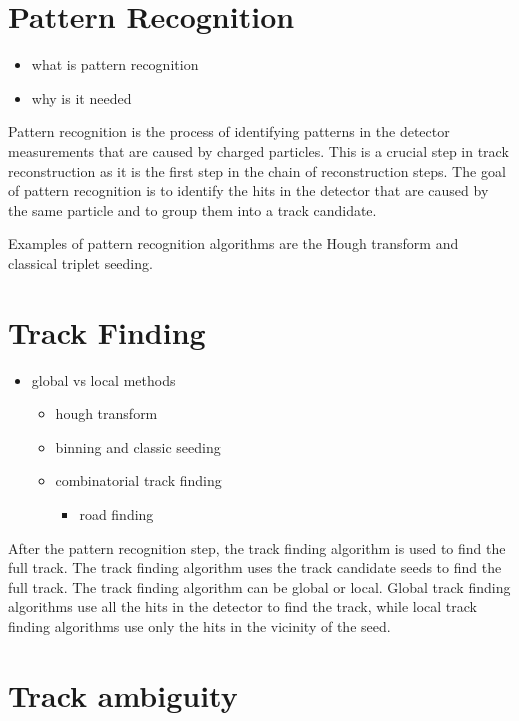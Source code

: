 \section{Pattern Recognition}

\begin{itemize}
    \color{red}
    \item what is pattern recognition
    \item why is it needed
\end{itemize}

Pattern recognition is the process of identifying patterns in the detector measurements that are caused by charged particles. This is a crucial step in track reconstruction as it is the first step in the chain of reconstruction steps. The goal of pattern recognition is to identify the hits in the detector that are caused by the same particle and to group them into a track candidate.

Examples of pattern recognition algorithms are the Hough transform and classical triplet seeding.

\section{Track Finding}

\begin{itemize}
    \color{red}
    \item global vs local methods
    \begin{itemize}
        \item hough transform
        \item binning and classic seeding
        \item combinatorial track finding
        \begin{itemize}
            \item road finding
        \end{itemize}
    \end{itemize}
\end{itemize}

After the pattern recognition step, the track finding algorithm is used to find the full track. The track finding algorithm uses the track candidate seeds to find the full track. The track finding algorithm can be global or local. Global track finding algorithms use all the hits in the detector to find the track, while local track finding algorithms use only the hits in the vicinity of the seed.

\section{Track ambiguity}

